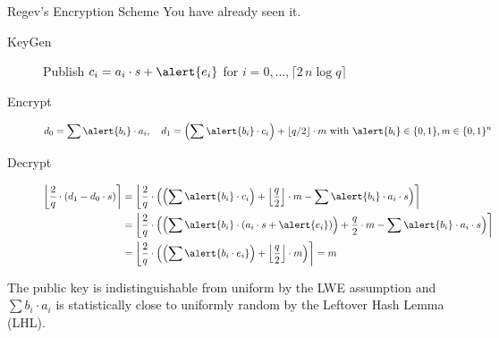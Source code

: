 \documentclass[xcolor=table,10pt,aspectratio=169]{beamer}
\begin{document}
\begin{frame}[label={sec:org66ae477}]{Regev's Encryption Scheme}
You have already seen it.

\begin{description}
\item[{KeyGen}] Publish \(c_{i} = a_{i} \cdot s + \alert{e_{i}}\) for \(i=0,\ldots, \lceil 2\, n \log q\rceil\)
\item[{Encrypt}] \[d_{0} = \sum \alert{b_{i}} \cdot a_{i},\quad  d_{1} = \left(\sum \alert{b_{i}} \cdot c_{i} \right) + \lfloor q/2 \rfloor \cdot m  \textnormal{ with } \alert{b_{i}} \in \bin, m \in \bin^{n}\]
\item[{Decrypt}] \begin{align*}
\left\lfloor \frac{2}{q} \cdot \left(d_{1} - d_{0} \cdot s\right) \right\rceil &= \left\lfloor \frac{2}{q} \cdot \left(\left(\sum \alert{b_{i}} \cdot c_{i} \right) + \left\lfloor \frac{q}{2} \right\rfloor  \cdot m - \sum \alert{b_{i}} \cdot a_{i} \cdot s\right) \right\rceil\\
&= \left\lfloor \frac{2}{q} \cdot \left(\left(\sum \alert{b_{i}} \cdot (a_{i} \cdot s + \alert{e_{i}}) \right) + \frac{q}{2} \cdot m - \sum \alert{b_{i}} \cdot a_{i} \cdot s\right) \right\rceil\\
&= \left\lfloor \frac{2}{q} \cdot \left(\left(\sum \alert{b_{i} \cdot e_{i}} \right) + \left\lfloor \frac{q}{2} \right\rfloor  \cdot m \right) \right\rceil = m
\end{align*}
\end{description}

The public key is indistinguishable from uniform by the LWE assumption and \(\sum b_{i} \cdot a_{i}\) is statistically close to uniformly random by the Leftover Hash Lemma (LHL).
\end{frame}
\end{document}

